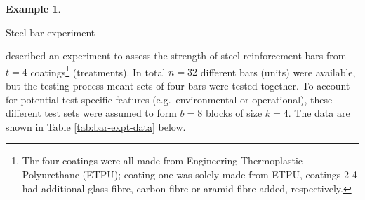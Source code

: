 \documentclass[
]{book}
\theoremstyle{definition}
\theoremstyle{definition}
\newtheorem{example}{Example}[chapter]
\theoremstyle{definition}
\theoremstyle{definition}
\theoremstyle{remark}
\begin{document}
\begin{example}
\protect\hypertarget{exm:blocks-bars}{}\label{exm:blocks-bars}

Steel bar experiment \citep[ch.~4]{Morris2011}

\citet{KSN2005} described an experiment to assess the strength of steel reinforcement bars from \(t=4\) coatings\footnote{Thr four coatings were all made from Engineering Thermoplastic Polyurethane (ETPU); coating one was solely made from ETPU, coatings 2-4 had additional glass fibre, carbon fibre or aramid fibre added, respectively.} (treatments). In total \(n=32\) different bars (units) were available, but the testing process meant sets of four bars were tested together. To account for potential test-specific features (e.g.~environmental or operational), these different test sets were assumed to form \(b=8\) blocks of size \(k=4\). The data are shown in Table \ref{tab:bar-expt-data} below.


\end{example}
\end{document}
